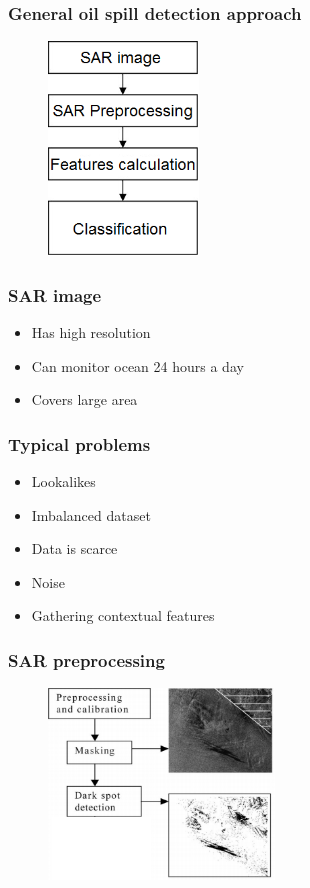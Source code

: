 \documentclass{beamer}
\begin{document}
\begin{frame}
\frametitle{General oil spill detection approach}
\begin{figure}
	\centering
    \includegraphics[width=40mm,scale=1]{./img/basicsteps.png}
\end{figure}



\end{frame}
\begin{frame}
\frametitle{SAR image}
\begin{itemize}
	\item Has high resolution
	\item Can monitor ocean 24 hours a day
	\item Covers large area 

\end{itemize}
\end{frame}


\begin{frame}
\frametitle{Typical problems}
\begin{itemize}
	\item Lookalikes
	\item Imbalanced dataset
	\item Data is scarce
	\item Noise
	\item Gathering contextual features
	
\end{itemize}
\end{frame}



\begin{frame}
\frametitle{SAR preprocessing}
\begin{figure}
	\centering
    \includegraphics[width=60mm,scale=1]{./img/preprocessing_diagram.png}
\end{figure}
\end{frame}
\end{document}
